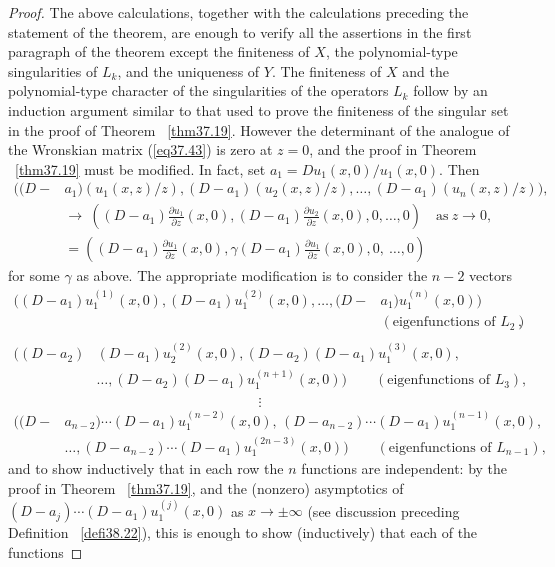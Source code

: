 \documentclass{surv-l}
\theoremstyle{plain}
\theoremstyle{definition}
\numberwithin{equation}{chapter}
\begin{document}
\begin{proof}
The above calculations, together with the calculations preceding the statement of the theorem, are enough to verify all the assertions in the first paragraph of the theorem except the finiteness of $X$, the polynomial-type singularities of $L_{k}$, and the uniqueness of $Y$. The finiteness of $X$ and the polynomial-type character of the singularities of the operators $L_{k}$ follow by an induction argument similar to that used to prove the finiteness of the singular set in the proof of Theorem ~\ref{thm37.19}. However the determinant of the analogue of the Wronskian matrix (\ref{eq37.43}) is zero at $z=0$, and the proof in Theorem ~\ref{thm37.19} must be modified. In fact, set $a_{1}=Du_{1}(x, 0)/u_{1}(x, 0)$. Then
\begin{align*}
((D-&a_{1})(u_{1} (x,z)/z), (D-a_{1})(u_{2}(x, z)/z),\ldots, (D-a_{1})(u_{n}(x, z)/z)),\\
&\rightarrow\ \left((D-a_{1})\frac{\partial u_{1}}{\partial z}(x, 0),(D-a_{1})\frac{\partial u_{2}}{\partial z}(x, 0),0,\ldots,0\right)\quad \text{as}\ z\rightarrow 0,\\
&=\left((D-a_{1})\frac{\partial u_{1}}{\partial z}(x, 0),\gamma(D-a_{1})\frac{\partial u_{1}}{\partial z}(x, 0),0,\ \ldots,0\right)
\end{align*}
for some $\gamma$ as above. The appropriate modification is to consider the $n-2$ vectors
\begin{align*}
((D-a_{1})u_{1}^{(1)}(x, 0),(D-a_{1})u_{1}^{(2)}(x,0), \ldots, (D-&a_{1})u_{1}^{(n)}(x, 0))\\
&(\text{eigenfunctions of } L_{2}),\\
\end{align*}
\begin{align*}
((D-a_{2})&(D-a_{1})u_{2}^{(2)}(x, 0),(D-a_{2})(D-a_{1})u_{1}^{(3)}(x,0),\\
&\ldots, (D-a_{2})(D-a_{1})u_{1}^{(n+1)}(x, 0))\qquad (\text{eigenfunctions of } L_{3}),\\
\end{align*}
\begin{equation*}
\vdots
\end{equation*}
\begin{align*}
((D-&a_{n-2})\cdots(D-a_{1})u_{1}^{(n-2)}(x, 0),\, (D-a_{n-2})\cdots (D-a_{1})u_{1}^{(n-1)}(x, 0),\\
&\ldots,(D-a_{n-2})\cdots(D-a_{1})u_{1}^{(2n-3)}(x, 0))\qquad (\text{eigenfunctions of }L_{n-1}),
\end{align*}
and to show inductively that in each row the $n$ functions are independent: by the proof in Theorem ~\ref{thm37.19}, and the (nonzero) asymptotics of $(D-a_{j})\cdots(D-a_{1})u_{1}^{(j)}(x, 0)$ as $ x\rightarrow\pm\infty$ (see discussion preceding Definition ~\ref{defi38.22}), this is enough to show (inductively) that each of the functions

\end{proof}
\end{document}

